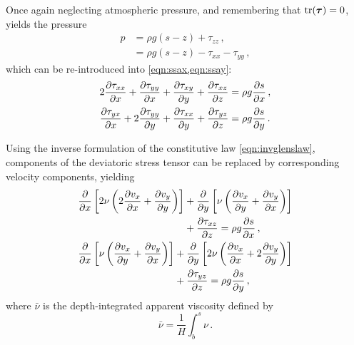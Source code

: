 \documentclass[a4paper]{kappa}
\newcommand{\tens}[1]{\vb*{#1}} %
\newcommand{\DST}[0]{\tens{\tau}}       %
\begin{document}
Once again neglecting atmospheric pressure, and remembering that $\tr(\DST)=0$,
 yields the pressure
\begin{align}
    p &= \rho g (s-z) + \tau_{zz} \,, \\
      &= \rho g (s-z) - \tau_{xx} - \tau_{yy} \,,
\end{align}
which can be re-introduced into \cref{eqn:ssax,eqn:ssay}:
\begin{subequations}
\begin{align}
    2\pdv{\tau_{xx}}{x} + \pdv{\tau_{yy}}{x} + \pdv{\tau_{xy}}{y}
        + \pdv{\tau_{xz}}{z} &= \rho g \pdv{s}{x} \,, \\
    \pdv{\tau_{yx}}{x} + 2\pdv{\tau_{yy}}{y} + \pdv{\tau_{xx}}{y}
        + \pdv{\tau_{yz}}{z} &= \rho g \pdv{s}{y} \,.
\end{align}
\end{subequations}

Using the inverse formulation of the constitutive law \eqref{eqn:invglenslaw},
components of the deviatoric stress tensor can be replaced by corresponding
velocity components, yielding
\begin{subequations}
\begin{gather}
  \begin{split}
    \pdv{x} \left[2\relax{\nu}
                  \left(2\pdv{v_x}{x} + \pdv{v_y}{y}\right) \right]
        &+ \pdv{y} \left[\relax{\nu}
                         \left(\pdv{v_x}{y} + \pdv{v_y}{x}\right) \right] \\
        &+ \pdv{\tau_{xz}}{z} = \rho g \pdv{s}{x} \,,
  \end{split}\\
  \begin{split}
    \pdv{x} \left[\relax{\nu}
                  \left(\pdv{v_x}{y} + \pdv{v_y}{x}\right) \right]
        &+ \pdv{y} \left[2\relax{\nu}
                         \left(\pdv{v_x}{x} + 2\pdv{v_y}{y}\right) \right] \\
        &+ \pdv{\tau_{yz}}{z} = \rho g \pdv{s}{y} \,,
  \end{split}
\end{gather}
\end{subequations}
where $\bar{\nu}$ is the depth-integrated apparent viscosity defined by
\begin{equation}
    \bar{\nu} = \frac{1}{H}\int_b^s\nu \,.
\end{equation}
\end{document}
